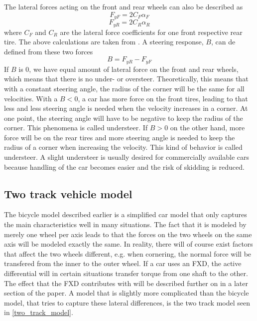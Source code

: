 The lateral forces acting on the front and rear wheels can also be described as 
\begin{equation}
	F_{yF} = 2C_{F}\alpha _{F}
\end{equation}
\begin{equation}
	F_{yR} = 2C_{R}\alpha _{R}
\end{equation}
where $ C_{F} $ and $ C_{R} $ are the lateral force coefficients for one front respective rear tire. The above calculations are taken from \cite{rajamani}. A steering response, $ B $, can de defined from these two forces \cite{fordonsdynamik99}
\begin{equation}
	B = F_{yR} - F_{yF}
\end{equation}
If $ B $ is 0, we have equal amount of lateral force on the front and rear wheels, which means that there is no under- or oversteer. Theoretically, this means that with a constant steering angle, the radius of the corner will be the same for all velocities. With a $ B < 0 $, a car has more force on the front tires, leading to that less and less steering angle is needed when the velocity increases in a corner. At one point, the steering angle will have to be negative to keep the radius of the corner. This phenomena is called understeer. If $ B > 0 $ on the other hand, more force will be on the rear tires and more steering angle is needed to keep the radius of a corner when increasing the velocity. This kind of behavior is called understeer. A slight understeer is usually desired for commercially available cars because handling of the car becomes easier and the risk of skidding is reduced.

\subsection{Two track vehicle model}

The bicycle model described earlier is a simplified car model that only captures the main characteristics well in many situations. The fact that it is modeled by merely one wheel per axis leads to that the forces on the two wheels on the same axis will be modeled exactly the same. In reality, there will of course exist factors that affect the two wheels different, e.g. when cornering, the normal force will be transfered from the inner to the outer wheel. If a car uses an FXD, the active differential will in certain situations transfer torque from one shaft to the other. The effect that the FXD contributes with will be described further on in a later section of the paper. A model that is slightly more complicated than the bicycle model,  that tries to capture these lateral differences, is the two track model seen in \ref{two_track_model}. 

